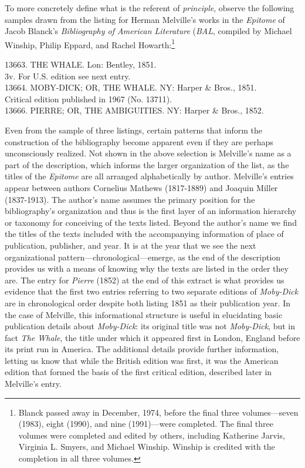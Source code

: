 To more concretely define what is the referent of \textit{principle}, observe the following samples drawn from the listing for Herman Melville's works in the \textit{Epitome} of Jacob Blanck's \textit{Bibliography of American Literature} (\textit{BAL}, compiled by Michael Winship, Philip Eppard, and Rachel Howarth:\footnote{Blanck passed away in  December, 1974, before the final three volumes---seven (1983), eight (1990), and nine (1991)---were completed. The final three volumes were completed and edited by others, including Katherine Jarvis, Virginia L. Smyers, and Michael Winship. Winship is credited with the completion in all three volumes.}
\begin{displayquote}
13663. \textsc{THE WHALE}. Lon: Bentley, 1851.
\\
\hspace*{3 pc}\small 3v. For U.S. edition see next entry.
\\
13664. \textsc{MOBY-DICK; OR, THE WHALE.} NY: Harper \&  Bros., 1851.
\\
\hspace*{3 pc}\small Critical edition published in 1967 (No. 13711).
\\
13666. \textsc{PIERRE; OR, THE AMBIGUITIES.} NY: Harper \& Bros., 1852. \autocite[200-1]{winship_epitome_1995}
\end{displayquote}

Even from the sample of three listings, certain patterns that inform the construction of the bibliography become apparent even if they are perhaps unconsciously realized. Not shown in the above selection is Melville's name as a part of the description, which informs the larger organization of the list, as the titles of the \textit{Epitome} are all arranged alphabetically by author. Melville's entries appear between authors Cornelius Mathews (1817-1889) and Joaquin Miller (1837-1913). The author's name assumes the primary position for the bibliography's organization and thus is the first layer of an information hierarchy or taxonomy for conceiving of the texts listed. Beyond the author's name we find the titles of the texts included with the accompanying information of place of publication, publisher, and year. It is at the year that we see the next organizational pattern---chronological---emerge, as the  end of the description provides us with a means of knowing why the texts are listed in the order they are. The entry for \textit{Pierre} (1852) at the end of this extract is what provides us evidence that the first two entries referring to two separate editions of \textit{Moby-Dick} are in chronological order despite both listing 1851 as their publication year. In the case of Melville, this informational structure is useful in elucidating basic publication details about \textit{Moby-Dick}: its original title was not \textit{Moby-Dick}, but in fact \textit{The Whale}, the title under which it appeared first in London, England before its print run in America. The additional details provide further information, letting us know that while the British edition was first, it was the American edition that formed the basis of the first critical edition, described later in Melville's entry. 

